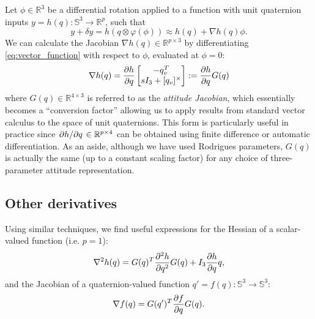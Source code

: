\documentclass[letterpaper, 10 pt, conference]{ieeeconf}  %
\newcommand{\R}{\mathbb{R}}
\newcommand{\Q}{\mathbb{S}^3}
\newcommand{\skewmat}[1]{[#1]^\times}
\begin{document}
        Let $\phi \in \R^3$ be a differential rotation applied to a function with
        unit quaternion inputs $y = h(q): \Q \to \R^p$, such that
        \begin{equation} \label{eq:vector_function}
            y + \delta y = h(q \otimes \varphi(\phi)) \approx h(q) +  \nabla h(q) \phi.
        \end{equation}
        We can calculate the Jacobian $\nabla h(q) \in \R^{p \times 3}$ by
        differentiating \eqref{eq:vector_function} with respect to $\phi$, evaluated at
        $\phi = 0$:
        \begin{equation} \label{eq:quat_gradient}
            \nabla h(q) = \pdv{h}{q} \begin{bmatrix} 
                            -q_v^T \\ 
                            sI_3 + \skewmat{q_v}
                        \end{bmatrix}
                        := \pdv{h}{q} G(q) 
        \end{equation}
        where $G(q) \in \R^{4 \times 3}$ is referred to as the \textit{attitude Jacobian}, which
        essentially becomes a ``conversion factor'' allowing us to apply results from
        standard vector calculus to the space of unit quaternions. This form is
        particularly useful in practice since $\pdv*{h}{q} \in \R^{p \times 4}$ can be
        obtained using finite difference or automatic differentiation.
        As an aside, although we have used Rodrigues parameters, $G(q)$ is actually the
        same (up to a constant scaling factor) for any choice of three-parameter attitude
        representation.

    \subsection{Other derivatives}
        Using similar techniques, we find useful expressions for the Hessian of a
        scalar-valued function (i.e. $p = 1$):
	    \begin{equation} \label{eq:quat_hessian}
            \nabla^2 h(q) = G(q)^T \pdv[2]{h}{q} G(q) + I_3 \pdv{h}{q}q,
        \end{equation}
        and the Jacobian of a quaternion-valued function $q' = f(q) : \Q \to \Q$:
        \begin{equation} \label{eq:quat_jacobian}
            \nabla f(q) = G(q')^T \pdv{f}{q} G(q).
        \end{equation}
\end{document}
